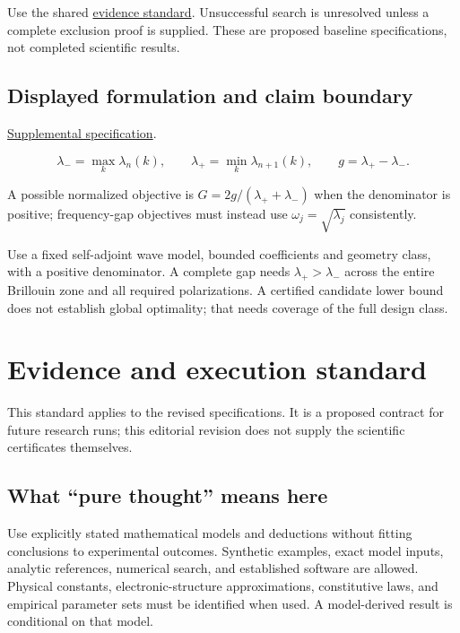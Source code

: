 \documentclass[
  11pt,
]{article}
\begin{document}
Use the shared
\href{https://github.com/rick-stevens-ai/Pure-Thought/blob/main/reviews/EVIDENCE-STANDARD.md}{evidence
standard}. Unsuccessful search is unresolved unless a complete exclusion
proof is supplied. These are proposed baseline specifications, not
completed scientific results.

\subsection{Displayed formulation and claim boundary}

\href{https://github.com/rick-stevens-ai/Pure-Thought/blob/main/supplemental/S02.md}{Supplemental
specification}.

\[\lambda_- =\max_k\lambda_n(k),\qquad
\lambda_+=\min_k\lambda_{n+1}(k),\qquad
g=\lambda_+-\lambda_-. \]

A possible normalized objective is \(G=2g/(\lambda_++\lambda_-)\) when
the denominator is positive; frequency-gap objectives must instead use
\(\omega_j=\sqrt{\lambda_j}\) consistently.

Use a fixed self-adjoint wave model, bounded coefficients and geometry
class, with a positive denominator. A complete gap needs
\(\lambda_+>\lambda_-\) across the entire Brillouin zone and all
required polarizations. A certified candidate lower bound does not
establish global optimality; that needs coverage of the full design
class.

\section{Evidence and execution standard}

This standard applies to the revised specifications. It is a proposed
contract for future research runs; this editorial revision does not
supply the scientific certificates themselves.

\subsection{What ``pure thought'' means here}

Use explicitly stated mathematical models and deductions without fitting
conclusions to experimental outcomes. Synthetic examples, exact model
inputs, analytic references, numerical search, and established software
are allowed. Physical constants, electronic-structure approximations,
constitutive laws, and empirical parameter sets must be identified when
used. A model-derived result is conditional on that model.
\end{document}
